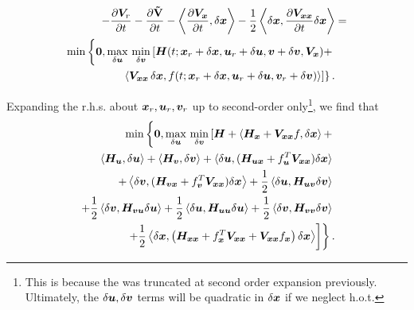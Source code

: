 \begin{align}
	\begin{split} 
		-\frac{\partial \valuefunc_r}{\partial t} -\frac{\partial \costdiff}{\partial t} - \left\langle \dfrac{\partial\valuefunc_{\state}}{\partial t}, \delta\state \right \rangle -  \dfrac{1}{2} \left\langle \delta \state, \dfrac{\partial \valuefunc_{\state\state} }{\partial t}\delta\state \right \rangle &=  \\
		\min \left\{\bm{0},  
		\max_{\delta \control} \, \min_{\delta \disturb} \left[\hamfunc(t; \state_r + \delta \state, \control_r + \delta \control, \disturb + \delta \disturb, \valuefunc_{\state}) + \right. \right. \\
		\left. \left.  \left\langle \valuefunc_{\state\state}\, \delta \state, f(t; \state_r + \delta \state, \control_r + \delta \control,  \disturb_r + \delta \disturb)  \right\rangle\right] \right\}. 
	\end{split}
\label{eq:rob_expand}
\end{align}

Expanding the r.h.s. about $\bm{x}_r, \bm{u}_r, \bm{v}_r$ up to second-order only\footnote{This is because the \lhs was truncated at  second order expansion previously. Ultimately, the $\delta \bm{u}, \delta \bm{v}$ terms will be quadratic in $\delta \bm{x}$ if we neglect h.o.t.}, we find that
%
\begin{align}
	\begin{split} 
		\min \left\{\bm{0},  
		\max_{\delta \control} \, \min_{\delta \disturb} \left[\hamfunc + \left\langle \hamfunc_{\state}  + \valuefunc_{\state \state} f, \delta \state\right\rangle + \right. \right. \\
		\left. \left. \langle \hamfunc_{\control }, \delta \control \rangle + \langle \hamfunc_{\disturb }, \delta \disturb \rangle +  \langle \delta \control, (\hamfunc_{\control  \state} + f_{\control}^T \valuefunc_{\state \state}) \delta \state  \rangle \right. \right. \\
		\left. \left. 
		+  \left\langle \delta \disturb, (\hamfunc_{\disturb  \state} + f_{\disturb}^T \valuefunc_{\state \state}) \delta \state  \right\rangle + \dfrac{1}{2}\left\langle\delta \control, \hamfunc_{\control  \disturb} \delta \disturb  \right\rangle  \right. \right. \\
		\left. \left. 
		 + \dfrac{1}{2}\left\langle\delta \disturb, \hamfunc_{\disturb  \control} \delta \control \right\rangle +  \dfrac{1}{2} \left\langle \delta \control, \hamfunc_{\control  \control} \delta \control \right\rangle +  \dfrac{1}{2} \left\langle \delta \disturb, \hamfunc_{\disturb  \disturb} \delta \disturb \right\rangle \right. \right. \\
		\left. \left. 
		+    \dfrac{1}{2} \left\langle \delta \state, \left(\hamfunc_{\state \state} + f_{\state}^T \valuefunc_{\state \state}  + \valuefunc_{\state \state} f_{\state} \right) \delta \state \right\rangle \right] \right\}. 
	\end{split}
\label{eq:rob_rhs}
\end{align}

